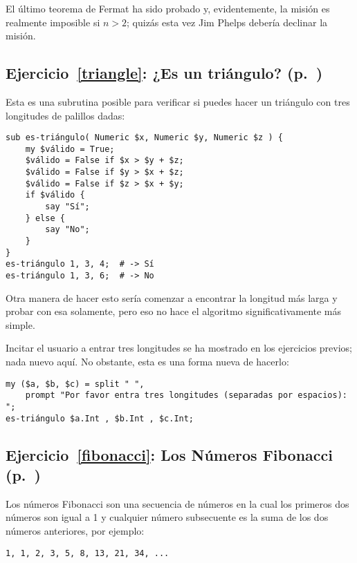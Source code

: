 El último teorema de Fermat ha sido probado y, evidentemente,
la misión es realmente imposible si $n > 2$; quizás esta vez Jim Phelps 
debería declinar la misión.

\subsection{Ejercicio~\ref{triangle}: ¿Es un triángulo? (p.~\pageref{triangle})}
\label{sol_triangle}

Esta es una subrutina posible para verificar si puedes 
hacer un triángulo con tres longitudes de palillos dadas:

\begin{verbatim}
sub es-triángulo( Numeric $x, Numeric $y, Numeric $z ) {
    my $válido = True;
    $válido = False if $x > $y + $z;
    $válido = False if $y > $x + $z;
    $válido = False if $z > $x + $y;
    if $válido {
        say "Sí"; 
    } else {
        say "No";
    }
}
es-triángulo 1, 3, 4;  # -> Sí
es-triángulo 1, 3, 6;  # -> No
\end{verbatim}

Otra manera de hacer esto sería comenzar a encontrar la longitud 
más larga y probar con esa solamente, pero eso no hace el 
algoritmo significativamente más simple.

Incitar el usuario a entrar tres longitudes se ha mostrado en
los ejercicios previos; nada nuevo aquí. No obstante, esta es 
una forma nueva de hacerlo:

\begin{verbatim}
my ($a, $b, $c) = split " ", 
    prompt "Por favor entra tres longitudes (separadas por espacios): ";
es-triángulo $a.Int , $b.Int , $c.Int;
\end{verbatim}


\subsection{Ejercicio~\ref{fibonacci}: Los Números Fibonacci (p.~\pageref{fibonacci})}
\label{sol_fibonacci}

Los números Fibonacci son una secuencia de números en la cual
los primeros dos números son igual a 1 y cualquier número subsecuente
es la suma de los dos números anteriores, por ejemplo:

\begin{verbatim}
1, 1, 2, 3, 5, 8, 13, 21, 34, ...
\end{verbatim}

